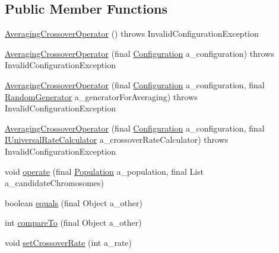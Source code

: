 \subsection*{Public Member Functions}
\begin{DoxyCompactItemize}
\item 
\hyperlink{classorg_1_1jgap_1_1impl_1_1_averaging_crossover_operator_a445b36b5652013a1c76d10e0863025ca}{Averaging\-Crossover\-Operator} ()  throws Invalid\-Configuration\-Exception 
\item 
\hyperlink{classorg_1_1jgap_1_1impl_1_1_averaging_crossover_operator_a3e09ea7b51ae0506f7afdb2acad786e4}{Averaging\-Crossover\-Operator} (final \hyperlink{classorg_1_1jgap_1_1_configuration}{Configuration} a\-\_\-configuration)  throws Invalid\-Configuration\-Exception 
\item 
\hyperlink{classorg_1_1jgap_1_1impl_1_1_averaging_crossover_operator_ac417121ec63c38f40703fdd07cec2410}{Averaging\-Crossover\-Operator} (final \hyperlink{classorg_1_1jgap_1_1_configuration}{Configuration} a\-\_\-configuration, final \hyperlink{interfaceorg_1_1jgap_1_1_random_generator}{Random\-Generator} a\-\_\-generator\-For\-Averaging)  throws Invalid\-Configuration\-Exception 
\item 
\hyperlink{classorg_1_1jgap_1_1impl_1_1_averaging_crossover_operator_a9647d105455fe598519bfb512b8a4a98}{Averaging\-Crossover\-Operator} (final \hyperlink{classorg_1_1jgap_1_1_configuration}{Configuration} a\-\_\-configuration, final \hyperlink{interfaceorg_1_1jgap_1_1_i_universal_rate_calculator}{I\-Universal\-Rate\-Calculator} a\-\_\-crossover\-Rate\-Calculator)  throws Invalid\-Configuration\-Exception 
\item 
void \hyperlink{classorg_1_1jgap_1_1impl_1_1_averaging_crossover_operator_a6acef66720d9c62e2be2f570bd0755f9}{operate} (final \hyperlink{classorg_1_1jgap_1_1_population}{Population} a\-\_\-population, final List a\-\_\-candidate\-Chromosomes)
\item 
boolean \hyperlink{classorg_1_1jgap_1_1impl_1_1_averaging_crossover_operator_a09845e6953f1666564ee8b0b5656533b}{equals} (final Object a\-\_\-other)
\item 
int \hyperlink{classorg_1_1jgap_1_1impl_1_1_averaging_crossover_operator_a64d5267c8a2a2087c24839db5d2ff892}{compare\-To} (final Object a\-\_\-other)
\item 
void \hyperlink{classorg_1_1jgap_1_1impl_1_1_averaging_crossover_operator_a8f32339f91d5f29c452f2a01b19d815d}{set\-Crossover\-Rate} (int a\-\_\-rate)
\end{DoxyCompactItemize}
